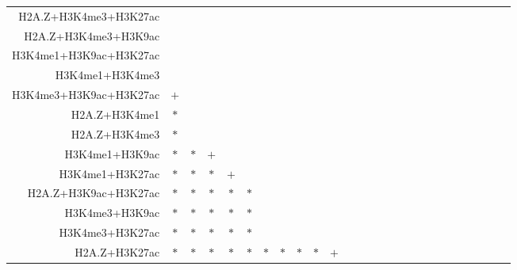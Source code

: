 \documentclass{bioinfo}
\begin{document}
\begin{table}[t]
\begin{center}
\begin{tabular}{ rccccccccccccccccccccccccc }
    H2A.Z+H3K4me3+H3K27ac &     &     &     &     &     &     &     &     &     &     &     &     &     &     &     &     &     &     &     &     &     &     &     &     &     \\
    H2A.Z+H3K4me3+H3K9ac &     &     &     &     &     &     &     &     &     &     &     &     &     &     &     &     &     &     &     &     &     &     &     &     &     \\
    H3K4me1+H3K9ac+H3K27ac &     &     &     &     &     &     &     &     &     &     &     &     &     &     &     &     &     &     &     &     &     &     &     &     &     \\
    H3K4me1+H3K4me3 &     &     &     &     &     &     &     &     &     &     &     &     &     &     &     &     &     &     &     &     &     &     &     &     &     \\
    H3K4me3+H3K9ac+H3K27ac & $+$ &     &     &     &     &     &     &     &     &     &     &     &     &     &     &     &     &     &     &     &     &     &     &     &     \\
    H2A.Z+H3K4me1 & $*$ &     &     &     &     &     &     &     &     &     &     &     &     &     &     &     &     &     &     &     &     &     &     &     &     \\
    H2A.Z+H3K4me3 & $*$ &     &     &     &     &     &     &     &     &     &     &     &     &     &     &     &     &     &     &     &     &     &     &     &     \\
    H3K4me1+H3K9ac & $*$ & $*$ & $+$ &     &     &     &     &     &     &     &     &     &     &     &     &     &     &     &     &     &     &     &     &     &     \\
    H3K4me1+H3K27ac & $*$ & $*$ & $*$ & $+$ &     &     &     &     &     &     &     &     &     &     &     &     &     &     &     &     &     &     &     &     &     \\
    H2A.Z+H3K9ac+H3K27ac & $*$ & $*$ & $*$ & $*$ & $*$ &     &     &     &     &     &     &     &     &     &     &     &     &     &     &     &     &     &     &     &     \\
    H3K4me3+H3K9ac & $*$ & $*$ & $*$ & $*$ & $*$ &     &     &     &     &     &     &     &     &     &     &     &     &     &     &     &     &     &     &     &     \\
    H3K4me3+H3K27ac & $*$ & $*$ & $*$ & $*$ & $*$ &     &     &     &     &     &     &     &     &     &     &     &     &     &     &     &     &     &     &     &     \\
    H2A.Z+H3K27ac & $*$ & $*$ & $*$ & $*$ & $*$ & $*$ & $*$ & $*$ & $*$ & $+$ &     &     &     &     &     &     &     &     &     &     &     &     &     &     &     \\

\end{tabular}
\end{center}
\end{table}
\end{document}
